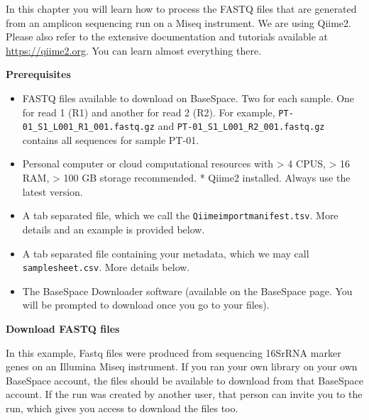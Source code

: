 \documentclass[
]{book}
\begin{document}
In this chapter you will learn how to process the FASTQ files that are generated from an amplicon sequencing run on a Miseq instrument. We are using Qiime2. Please also refer to the extensive documentation and tutorials available at \url{https://qiime2.org}. You can learn almost everything there.

\hfill\break

\textbf{Prerequisites}

\begin{itemize}
\item
  FASTQ files available to download on BaseSpace. Two for each sample. One for read 1 (R1) and another for read 2 (R2). For example, \texttt{PT-01\_S1\_L001\_R1\_001.fastq.gz} and \texttt{PT-01\_S1\_L001\_R2\_001.fastq.gz} contains all sequences for sample PT-01.
\item
  Personal computer or cloud computational resources with \textgreater{} 4 CPUS, \textgreater{} 16 RAM, \textgreater{} 100 GB storage recommended. * Qiime2 installed. Always use the latest version.\\
\item
  A tab separated file, which we call the \texttt{Qiimeimportmanifest.tsv}. More details and an example is provided below.\\
\item
  A tab separated file containing your metadata, which we may call \texttt{samplesheet.csv}. More details below.
\item
  The BaseSpace Downloader software (available on the BaseSpace page. You will be prompted to download once you go to your files).

  \hfill\break
\end{itemize}

\textbf{Download FASTQ files}

In this example, Fastq files were produced from sequencing 16SrRNA marker genes on an Illumina Miseq instrument. If you ran your own library on your own BaseSpace account, the files should be available to download from that BaseSpace account. If the run was created by another user, that person can invite you to the run, which gives you access to download the files too.
\end{document}
